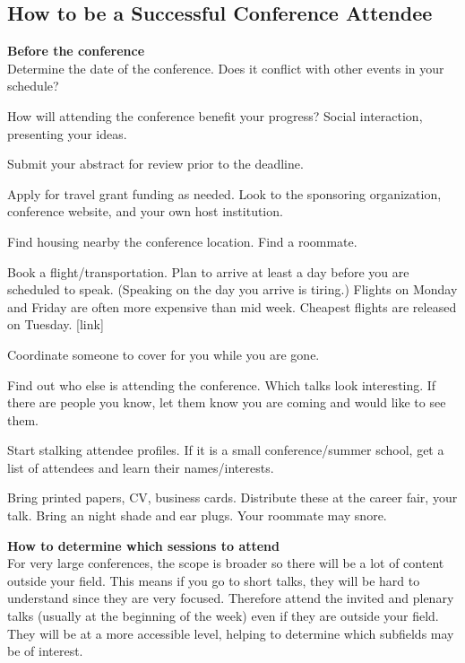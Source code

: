 \subsection{How to be a Successful Conference Attendee}


\textbf{Before the conference}\\

Determine the date of the conference. Does it conflict with other events in your schedule?

How will attending the conference benefit your progress? Social interaction, presenting your ideas.

Submit your abstract for review prior to the deadline.

Apply for travel grant funding as needed. Look to the sponsoring organization, conference website, and your own host institution.

Find housing nearby the conference location. Find a roommate.

Book a flight/transportation. Plan to arrive at least a day before you are scheduled to speak. (Speaking on the day you arrive is tiring.) Flights on Monday and Friday are often more expensive than mid week. Cheapest flights are released on Tuesday. [link]

Coordinate someone to cover for you while you are gone.

Find out who else is attending the conference. Which talks look interesting. If there are people you know, let them know you are coming and would like to see them.

Start stalking attendee profiles. If it is a small conference/summer school, get a list of attendees and learn their names/interests.

Bring printed papers, CV, business cards. Distribute these at the career fair, your talk. Bring an night shade and ear plugs. Your roommate may snore.

\textbf{How to determine which sessions to attend}\\

For very large conferences, the scope is broader so there will be a lot of content outside your field. This means if you go to short talks, they will be hard to understand since they are very focused. Therefore attend the invited and plenary talks (usually at the beginning of the week) even if they are outside your field. They will be at a more accessible level, helping to determine which subfields may be of interest.

